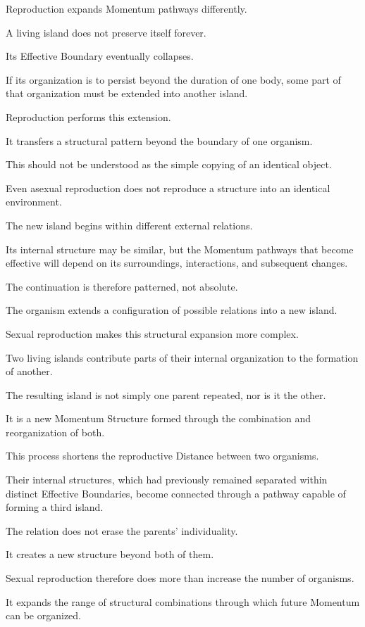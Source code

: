 Reproduction expands Momentum pathways differently.

A living island does not preserve itself forever.

Its Effective Boundary eventually collapses.

If its organization is to persist beyond the duration of one body, some part of that organization must be extended into another island.

Reproduction performs this extension.

It transfers a structural pattern beyond the boundary of one organism.

This should not be understood as the simple copying of an identical object.

Even asexual reproduction does not reproduce a structure into an identical environment.

The new island begins within different external relations.

Its internal structure may be similar, but the Momentum pathways that become effective will depend on its surroundings, interactions, and subsequent changes.

The continuation is therefore patterned, not absolute.

The organism extends a configuration of possible relations into a new island.

Sexual reproduction makes this structural expansion more complex.

Two living islands contribute parts of their internal organization to the formation of another.

The resulting island is not simply one parent repeated, nor is it the other.

It is a new Momentum Structure formed through the combination and reorganization of both.

This process shortens the reproductive Distance between two organisms.

Their internal structures, which had previously remained separated within distinct Effective Boundaries, become connected through a pathway capable of forming a third island.

The relation does not erase the parents’ individuality.

It creates a new structure beyond both of them.

Sexual reproduction therefore does more than increase the number of organisms.

It expands the range of structural combinations through which future Momentum can be organized.

